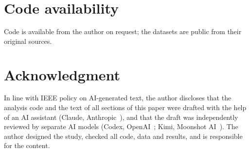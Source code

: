 \documentclass[conference]{IEEEtran}
\begin{document}
\section*{Code availability}
Code is available from the author on request; the datasets are public from their original sources.

\section*{Acknowledgment}
In line with IEEE policy on AI-generated text, the author discloses that the analysis code and the text of all sections of this paper were drafted with the help of an AI assistant (Claude, Anthropic~\cite{ai_claude}), and that the draft was independently reviewed by separate AI models (Codex, OpenAI~\cite{ai_codex}; Kimi, Moonshot AI~\cite{ai_kimi}). The author designed the study, checked all code, data and results, and is responsible for the content.
\end{document}
